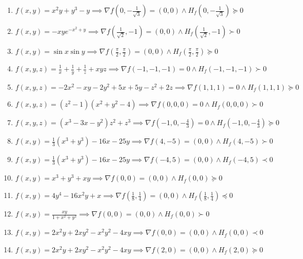\documentclass[11pt,a4paper]{article}
\begin{document}
\begin{enumerate}
\item $\displaystyle f(x, y) = x^{2} y + y^{3} - y \implies \nabla f\left( 0, -\frac{1}{\sqrt{3}} \right) = (0, 0) \land H_{f}\left( 0, -\frac{1}{\sqrt{3}} \right) \succeq 0$
\item $\displaystyle f(x, y) = -xy e^{-x^{2} + y} \implies \nabla f\left( \frac{1}{\sqrt{2}}, -1 \right) = (0, 0) \land H_{f}\left( \frac{1}{\sqrt{2}}, -1 \right) \succ 0$
\item $\displaystyle f(x, y) = \sin x \sin y \implies \nabla f\left( \frac{\pi}{2}, \frac{\pi}{2} \right) = (0, 0) \land H_{f}\left( \frac{\pi}{2}, \frac{\pi}{2} \right) \succeq 0$
\item $\displaystyle f(x, y, z) = \frac{1}{x} + \frac{1}{y} + \frac{1}{z} + xyz \implies \nabla f(-1, -1, -1) = 0 \land H_{f}(-1, -1, -1) \succ 0$
\item $\displaystyle f(x, y, z) = -2x^{2} - xy - 2y^{2} + 5x + 5y - z^{2} + 2z \implies \nabla f(1, 1, 1) = 0 \land H_{f}(1, 1, 1) \succeq 0$
\item $\displaystyle f(x, y, z) = (z^{2} - 1)(x^{2} + y^{2} - 4) \implies \nabla f(0, 0, 0) = 0 \land H_{f}(0, 0, 0) \succ 0$
\item $\displaystyle f(x, y, z) = (x^{3} - 3x - y^{2}) z^{2} + z^{3} \implies \nabla f\left( -1, 0, -\frac{4}{3} \right) = 0 \land H_{f}\left( -1, 0, -\frac{4}{3} \right) \succeq 0$
\item $\displaystyle f(x, y) = \frac{1}{3}(x^{3} + y^{3}) - 16x - 25y \implies \nabla f(4, -5) = (0, 0) \land H_{f}(4, -5) \succ 0$
\item $\displaystyle f(x, y) = \frac{1}{3}(x^{3} + y^{3}) - 16x - 25y \implies \nabla f(-4, 5) = (0, 0) \land H_{f}(-4, 5) \prec 0$
\item $\displaystyle f(x, y) = x^{3} + y^{3} + xy \implies \nabla f(0, 0) = (0, 0) \land H_{f}(0, 0) \succeq 0$
\item $\displaystyle f(x, y) = 4y^{4} - 16x^{2} y + x \implies \nabla f\left( \frac{1}{8}, \frac{1}{4} \right) = (0, 0) \land H_{f}\left( \frac{1}{8}, \frac{1}{4} \right) \preceq 0$
\item $\displaystyle f(x, y) = \frac{xy}{1 + x^{2} + y^{2}} \implies \nabla f(0, 0) = (0, 0) \land H_{f}(0, 0) \succ 0$
\item $\displaystyle f(x, y) = 2x^{2} y + 2x y^{2} - x^{2} y^{2} - 4xy \implies \nabla f(0, 0) = (0, 0) \land H_{f}(0, 0) \prec 0$
\item $\displaystyle f(x, y) = 2x^{2} y + 2x y^{2} - x^{2} y^{2} - 4xy \implies \nabla f(2, 0) = (0, 0) \land H_{f}(2, 0) \succeq 0$

\end{enumerate}
\end{document}
